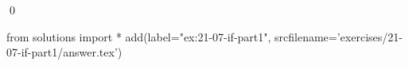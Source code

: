 
\begin{ex}
  \label{ex:21-07-if-part1}
  
  \qed
\end{ex}
\begin{python0}
from solutions import *
add(label="ex:21-07-if-part1",
    srcfilename='exercises/21-07-if-part1/answer.tex')
\end{python0}
